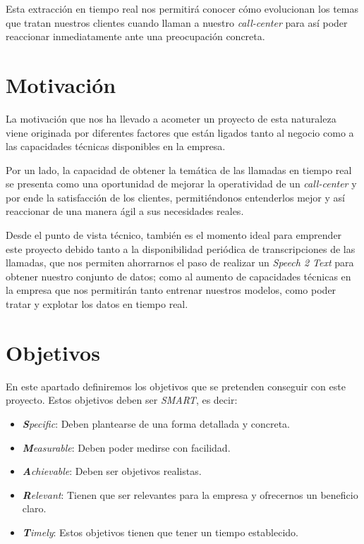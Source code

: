 Esta extracción en tiempo real nos permitirá conocer cómo evolucionan los temas que tratan nuestros clientes cuando llaman a nuestro \textit{call-center} para así poder reaccionar inmediatamente ante una preocupación concreta. 


\section{Motivación}
\label{section:intro:motivacion}
La motivación que nos ha llevado a acometer un proyecto de esta naturaleza viene originada por diferentes factores que están ligados tanto al negocio como a las capacidades técnicas disponibles en la empresa. 

Por un lado, la capacidad de obtener la temática de las llamadas en tiempo real se presenta como una oportunidad de mejorar la operatividad de un \textit{call-center} y por ende la satisfacción de los clientes, permitiéndonos entenderlos mejor y así reaccionar de una manera ágil a sus necesidades reales.

Desde el punto de vista técnico, también es el momento ideal para emprender este proyecto debido tanto a la disponibilidad periódica de transcripciones de las llamadas, que nos permiten ahorrarnos el paso de realizar un \textit{Speech 2 Text} para obtener nuestro conjunto de datos; como al aumento de capacidades técnicas en la empresa que nos permitirán tanto entrenar nuestros modelos, como poder tratar y explotar los datos en tiempo real. 


\section{Objetivos}
\label{section:intro:objetivos}
En este apartado definiremos los objetivos que se pretenden conseguir con este proyecto. Estos objetivos deben ser \textit{SMART}, es decir: 

\begin{itemize}
	\item \textit{\textbf{S}pecific}: Deben plantearse de una forma detallada y concreta.
	\item \textit{\textbf{M}easurable}: Deben poder medirse con facilidad.
	\item \textit{\textbf{A}chievable}: Deben ser objetivos realistas.
	\item \textit{\textbf{R}elevant}: Tienen que ser relevantes para la empresa y ofrecernos un beneficio claro.
	\item  \textit{\textbf{T}imely}: Estos objetivos tienen que tener un tiempo establecido.
\end{itemize}




